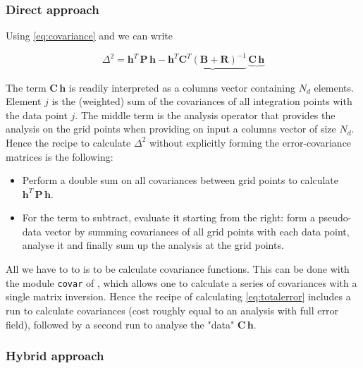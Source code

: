 \subsubsection{Direct approach}

Using \eqref{eq:covariance} and \label{eq:errorintegral} we can write

 \begin{equation}
 \Delta^2 = \mathbf{h}^T \, \mathbf{P} \, \mathbf{h} - \mathbf{h}^T \underbrace{\mathbf{C}^T \left( \mathbf{B}+\mathbf{R} \right)^{-1}} \, \underbrace{\mathbf{C}  \, \mathbf{h}}
 \label{eq:totalerror}
 \end{equation}
 
The term $\mathbf{C}  \, \mathbf{h}$ is readily interpreted as a columns vector containing $N_d$ elements. Element $j$ is the (weighted) sum of the covariances of all integration points with the data point $j$. The middle term is the analysis operator that provides the analysis on the grid points when providing on input a columns vector of size $N_d$. Hence the recipe to calculate $\Delta^2$ without explicitly forming the error-covariance matrices is the following:
\begin{itemize}
\item Perform a double sum on all covariances between grid points to calculate $\mathbf{h}^T \, \mathbf{P} \, \mathbf{h}$.
\item For the term to subtract, evaluate it starting from the right: form a pseudo-data vector by summing covariances of all grid points with each data point, analyse it and finally sum up the analysis at the grid points.
\end{itemize}

All we have to to is to be calculate covariance functions. This can be done with the module {\tt covar} of \diva, which allows one to calculate
a series of covariances with a single matrix inversion. Hence the recipe of calculating \eqref{eq:totalerror} includes a \diva run to calculate covariances (cost roughly equal to an analysis with full error field), followed by a second \diva run to analyse the "data" $\mathbf{C}  \, \mathbf{h}$.



\subsubsection{Hybrid approach}

